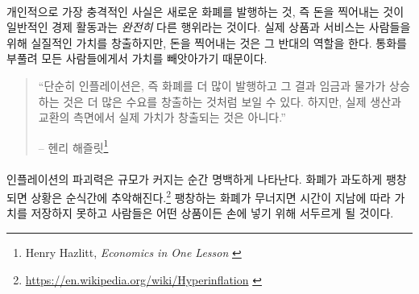 \paragraph{}
개인적으로 가장 충격적인 사실은 새로운 화폐를 발행하는 것, 즉 돈을 찍어내는 것이 
일반적인 경제 활동과는 \textit{완전히} 다른 행위라는 것이다. 
실제 상품과 서비스는 사람들을 위해 실질적인 가치를 창출하지만, 
돈을 찍어내는 것은 그 반대의 역할을 한다. 통화를 부풀려 모든 사람들에게서 가치를 빼앗아가기 때문이다. 

\begin{quotation}\begin{samepage}
		\enquote{단순히 인플레이션은, 즉 화폐를 더 많이 발행하고 그 결과 임금과 물가가 상승하는 것은 
		더 많은 수요를 창출하는 것처럼 보일 수 있다. 하지만, 실제 생산과 교환의 측면에서 실제 가치가 창출되는 것은 아니다.}
		\begin{flushright} -- 헨리 해즐릿\footnote{Henry Hazlitt, \textit{Economics in One Lesson} \cite{hazlitt}}
\end{flushright}\end{samepage}\end{quotation}

\paragraph{}
인플레이션의 파괴력은 규모가 커지는 순간 명백하게 나타난다. 
화폐가 과도하게 팽창되면 상황은 순식간에 추악해진다.\footnote{\url{https://en.wikipedia.org/wiki/Hyperinflation} \cite{wiki:hyperinflation}} 
팽창하는 화폐가 무너지면 시간이 지남에 따라 가치를 저장하지 못하고 
사람들은 어떤 상품이든 손에 넣기 위해 서두르게 될 것이다.

